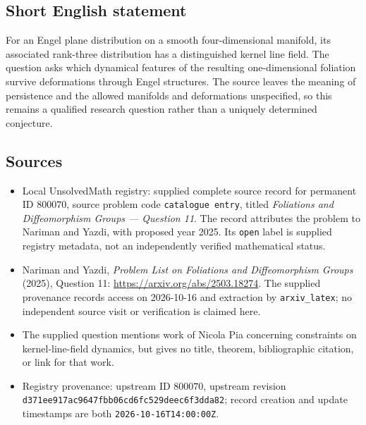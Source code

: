 \documentclass[11pt]{article}
\begin{document}
\subsection{Short English statement}
For an Engel plane distribution on a smooth four-dimensional manifold, its associated rank-three distribution has a distinguished kernel line field. The question asks which dynamical features of the resulting one-dimensional foliation survive deformations through Engel structures. The source leaves the meaning of persistence and the allowed manifolds and deformations unspecified, so this remains a qualified research question rather than a uniquely determined conjecture.
\subsection{Sources}
\begin{itemize}
\item Local UnsolvedMath registry: supplied complete source record for permanent ID \(800070\), source problem code \texttt{catalogue entry}, titled \emph{Foliations and Diffeomorphism Groups --- Question 11}. The record attributes the problem to Nariman and Yazdi, with proposed year 2025. Its \texttt{open} label is supplied registry metadata, not an independently verified mathematical status.
\item Nariman and Yazdi, \emph{Problem List on Foliations and Diffeomorphism Groups} (2025), Question 11: \url{https://arxiv.org/abs/2503.18274}. The supplied provenance records access on 2026-10-16 and extraction by \texttt{arxiv\_latex}; no independent source visit or verification is claimed here.
\item The supplied question mentions work of Nicola Pia concerning constraints on kernel-line-field dynamics, but gives no title, theorem, bibliographic citation, or link for that work.
\item Registry provenance: upstream ID \(800070\), upstream revision \texttt{d371ee917ac9647fbb06cd6fc529deec6f3dda82}; record creation and update timestamps are both \texttt{2026-10-16T14:00:00Z}.
\end{itemize}
\end{document}
